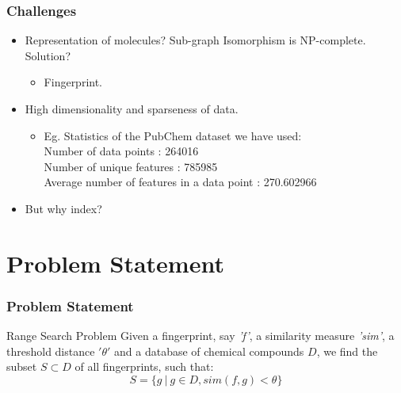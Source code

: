 \documentclass{beamer}
\begin{document}
\begin{frame}
\frametitle{Challenges}

\begin{itemize}
	\item<1-> Representation of molecules? Sub-graph Isomorphism is NP-complete. Solution? 
\begin{itemize}
	\item<2->[] Fingerprint. 	
\end{itemize}
	\item<3-> High dimensionality and sparseness of data.
\begin{itemize}	
	\item<4->[] Eg. Statistics of the PubChem dataset we have used:\\
	Number of data points : 264016 \\ 
	Number of unique features : 785985 \\ 
	Average number of features in a data point : 270.602966 \\ 
\end{itemize}

	\item<5-> But why index?
	
\end{itemize}

\end{frame}



\section{Problem Statement}
\begin{frame}
\frametitle{Problem Statement}

\begin{block}{Range Search Problem}
Given a fingerprint, say \textit{'f'}, a similarity measure \textit{'sim'}, a threshold distance \textbf{$'\theta'$} and a database of chemical compounds $D$, we find the subset $S \subset D$ of all fingerprints, such that: \\
\begin{equation}
 S= \{g~ |~ g \in D,sim(f,g) < \theta\}
\end{equation}
\end{block}


\end{frame}
\end{document}
